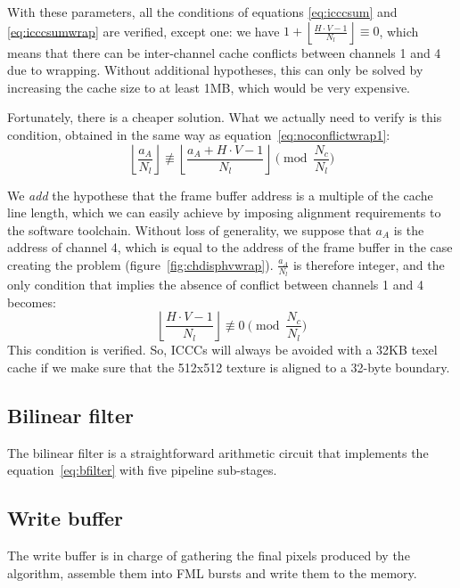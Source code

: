 \documentclass[a4paper,11pt]{kthesis}
\begin{document}
With these parameters, all the conditions of equations \ref{eq:icccsum} and \ref{eq:icccsumwrap} are verified, except one: we have $1 + \left\lfloor \frac{H \cdot V - 1}{N_{l}} \right\rfloor \equiv 0$, which means that there can be inter-channel cache conflicts between channels 1 and 4 due to wrapping. Without additional hypotheses, this can only be solved by increasing the cache size to at least 1MB, which would be very expensive.

Fortunately, there is a cheaper solution. What we actually need to verify is this condition, obtained in the same way as equation~\ref{eq:noconflictwrap1}:
\begin{equation}
\left\lfloor \frac{a_{A}}{N_{l}} \right\rfloor \not \equiv \left\lfloor \frac{a_{A}+H \cdot V-1}{N_{l}} \right\rfloor \pmod{\frac{N_{c}}{N_{l}}}
\end{equation}

We \textit{add} the hypothese that the frame buffer address is a multiple of the cache line length, which we can easily achieve by imposing alignment requirements to the software toolchain. Without loss of generality, we suppose that $a_{A}$ is the address of channel 4, which is equal to the address of the frame buffer in the case creating the problem (figure~\ref{fig:chdisphvwrap}). $\frac{a_{A}}{N_{l}}$ is therefore integer, and the only condition that implies the absence of conflict between channels 1 and 4 becomes:
\begin{equation}
\left\lfloor \frac{H \cdot V-1}{N_{l}} \right\rfloor \not \equiv 0 \pmod{\frac{N_{c}}{N_{l}}}
\end{equation}
This condition is verified. So, ICCCs will always be avoided with a 32KB texel cache if we make sure that the 512x512 texture is aligned to a 32-byte boundary.

\subsection{Bilinear filter}
The bilinear filter is a straightforward arithmetic circuit that implements the equation~\ref{eq:bfilter} with five pipeline sub-stages.

\subsection{Write buffer}
The write buffer is in charge of gathering the final pixels produced by the algorithm, assemble them into FML bursts and write them to the memory.
\end{document}
